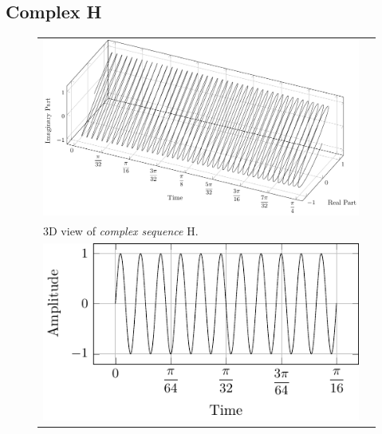 \documentclass[../../course]{subfiles}
\begin{document}
\subsection{Complex H}

\begin{figure} [H]

    \renewcommand{\arraystretch}{0.75}
    \centering
    \begin{NiceTabularX} {\textwidth} {
            *{2}{>{\centering\arraybackslash}X}
        }

         {
             {
                \includegraphics[height = \textheight] {tikzpics/plotComplexH.pdf}
            }
        }

        &
        \\

         {
            \vbox{
                 {3D view of \emph{complex sequence} H.}
                \label{plt:cmplxH}
            }
        }

        &
        \\

         {
             {
                \includegraphics[height = \textheight] {tikzpics/plotShortX3.pdf}
            }
        }


\end{NiceTabularX}
\end{figure}
\end{document}
